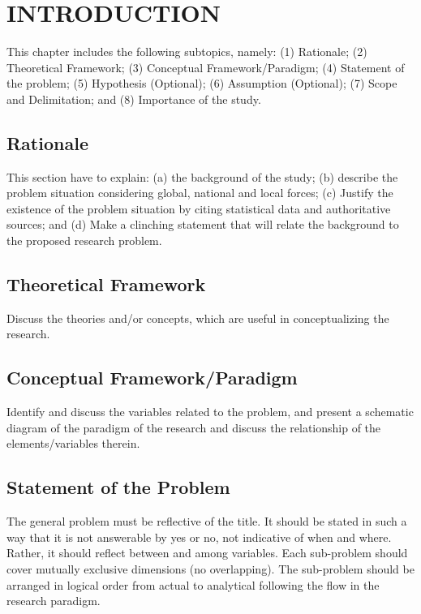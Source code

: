 \chapter{INTRODUCTION}
This chapter includes the following subtopics, namely: (1) Rationale; (2) Theoretical Framework; (3) Conceptual Framework/Paradigm; (4) Statement of the problem; (5) Hypothesis (Optional); (6) Assumption (Optional); (7) Scope and Delimitation;  and (8) Importance of the study.

\section{Rationale}
This section have to explain: (a) the background of the study; (b) describe the problem situation considering global, national and local forces; (c) Justify the existence of the problem situation by citing statistical data and authoritative sources; and (d) Make a clinching statement that will relate the background to the proposed research problem.

\section{Theoretical Framework}
Discuss the theories and/or concepts, which are useful in conceptualizing the research.

\section{Conceptual Framework/Paradigm}
Identify and discuss the variables related to the problem, and present a schematic diagram of the paradigm of the research and discuss the relationship of the elements/variables therein.

\section{Statement of the Problem}
The general problem must be reflective of the title. It should be stated in such a way that it is not answerable by yes or no, not indicative of when and where. Rather, it should reflect between and among variables. Each sub-problem should cover mutually exclusive dimensions (no overlapping). The sub-problem should be arranged in logical order from actual to analytical following the flow in the research paradigm.

